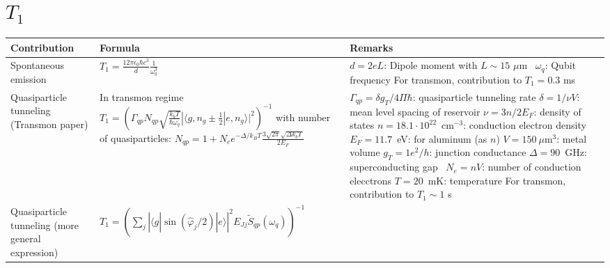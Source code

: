 \documentclass[]{article}
\newcommand{\ket}[1]{| #1 \rangle}
\newcommand{\bra}[1]{\langle #1 |}
\begin{document}
\section{$T_1$}
\begin{table}[h]
\centering
\begin{tabular}{|p{2cm}|p{5.5cm}|p{7.5cm}|}
	\hline 
Contribution	& Formula & Remarks \\ 
\hline \hline 
Spontaneous emission & $T_1 = \frac{12 \pi \epsilon_0 \hbar c^3}{d} \frac{1}{\omega_q^3}$~\cite{koch2007} & $d=2eL$: Dipole moment with $L\sim 15$ $\mu$m~\cite{koch2007} \newline $\omega_q$: Qubit frequency \newline
For transmon, contribution to $T_1=0.3$ ms~\cite{koch2007} \\
\hline
Quasiparticle tunneling (Transmon paper) & In transmon regime~\cite{koch2007} \newline $T_1 = \left( \Gamma_{qp} N_{qp} \sqrt{\frac{k_b T}{\hbar \omega_q}} | \langle g, n_g \pm \frac{1}{2} | e, n_g \rangle |^2 \right)^{-1}$ \newline
with number of quasiparticles: \newline $N_{qp} = 1 +N_e e^{-\Delta/k_BT}\frac{3\sqrt{2\pi} \sqrt{\Delta k_b T}}{2E_F}$
 & $\Gamma_{qp} =\delta g_T  / 4 \Pi \hbar $: quasiparticle tunneling rate  \newline
$\delta = 1  /  \nu V$: mean level spacing of reservoir \newline
$\nu = 3n/2E_F$: density of states \newline
$n = 18.1 \cdot 10^{22}$~cm${}^{-3}$: conduction electron density \newline
$E_F=11.7$~eV: for aluminum (as $n$) \newline
$V=150~\mu$m${}^3$: metal volume \newline
$g_T=1e^2/h$: junction conductance \newline
$\Delta=90$~GHz: superconducting gap~\cite{delta} \newline
$N_e=nV$: number of conduction elecctrons \newline
$T=20$~mK: temperature  \newline
For transmon, contribution to  $T_1 \sim 1$ s~\cite{koch2007} \\
\hline
Quasiparticle tunneling (more general expression) & $T_1 = \left( \sum_j \left| \bra{g} \sin ( \hat{\varphi}_j/2) \ket{e} \right|^{2} E_{Jj} \tilde{S}_{qp} (\omega_q) \right) ^{-1} $~\cite{catelani2011}& \\


\end{tabular}
\end{table}
\end{document}
